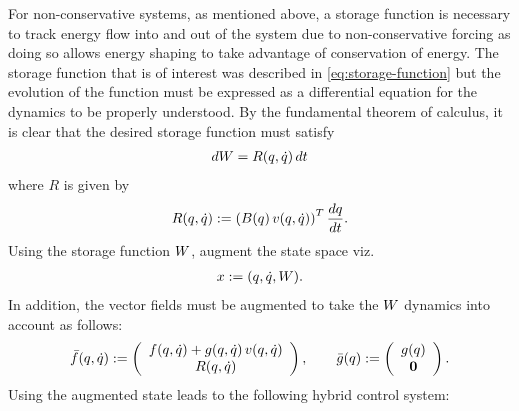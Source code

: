 For non-conservative systems, as mentioned above, a storage function is
necessary to track energy flow into and out of the system due to
non-conservative forcing as doing so allows energy shaping to take advantage of
conservation of energy.
% 
The storage function that is of interest was described in
\eqref{eq:storage-function} but the evolution of the function must be expressed
as a differential equation for the dynamics to be properly understood.
% 
By the fundamental theorem of calculus, it is clear that the desired storage
function must satisfy
\begin{align*}
  dW = R(q, \dot{q}) \, dt
\end{align*}
where $R$ is given by
\begin{align*}
  R(q, \dot{q}) := \left(B(q) \, v(q, \dot{q})\right)^{T} \frac{dq}{dt}.
\end{align*}
% 
Using the storage function $W$, augment the state space viz.
\begin{align*}
  x := (q, \dot{q}, W).
\end{align*}
% 
In addition, the vector fields must be augmented to take the $W$ dynamics into
account as follows:
\begin{align*}
  {\bar {f}}(q, \dot{q}) := \left(\begin{array}{c}
      f(q, \dot{q}) + g(q, \dot{q}) \, v(q, \dot{q})\\
      R(q, \dot{q})
    \end{array}\right), \qquad
  {\bar {g}}(q) := \left(\begin{array}{c}
      g(q)\\
      {\mathbf 0}
    \end{array}\right).
\end{align*}
Using the augmented state leads to the following hybrid control system:
